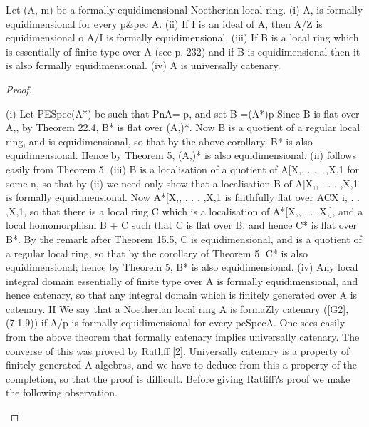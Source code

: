 \begin{theorem}[Theorem 31.6]\label{mcrt-auto-theorem-31-6}
\begin{mathematicalrecord}
Let (A, m) be a formally equidimensional Noetherian local
ring.
   (i) A, is formally equidimensional        for every p&pec A.
   (ii) If I is an ideal of A, then
               A/Z is equidimensional o A/I is formally equidimensional.
   (iii) If B is a local ring which is essentially of finite type over A (see
p. 232) and if B is equidimensional then it is also formally equidimensional.
   (iv) A is universally catenary.
\end{mathematicalrecord}
\end{theorem}
\begin{proof}
\begin{mathematicalrecord}
(i) Let PESpec(A*) be such that PnA= p, and set B =(A*)p
Since B is flat over A,, by Theorem 22.4, B* is flat over (A,)*. Now B is a
quotient of a regular local ring, and is equidimensional, so that by the above
corollary, B* is also equidimensional.         Hence by Theorem 5, (A,)* is also
equidimensional.
   (ii) follows easily from Theorem 5.
   (iii) B is a localisation of a quotient of A[X,, . . . ,X,1 for some n, so
that by (ii) we need only show that a localisation B of A[X,, . . . ,X,1 is
formally equidimensional.           Now A*[X,, . . . ,X,1 is faithfully flat over
ACX     i, . .  ,X,1,  so that there is a local ring C which is a localisation of
A*[X,, . . ,X,], and a local homomorphism           B + C such that C is flat over
B, and hence C* is flat over B*. By the remark after Theorem 15.5, C is
equidimensional, and is a quotient of a regular local ring, so that by the
corollary of Theorem 5, C* is also equidimensional; hence by Theorem 5,
B* is also equidimensional.
   (iv) Any local integral domain essentially of finite type over A is formally
equidimensional, and hence catenary, so that any integral domain which
is finitely generated over A is catenary. H
   We say that a Noetherian local ring A is formaZly catenary ([G2],
(7.1.9)) if A/p is formally equidimensional    for every pcSpecA. One sees
easily from the above theorem that formally catenary implies universally
catenary. The converse of this was proved by Ratliff [2]. Universally
catenary is a property of finitely generated A-algebras, and we have to
deduce from this a property of the completion, so that the proof is difficult.
Before giving Ratliff?s proof we make the following observation.

\end{mathematicalrecord}
\end{proof}
